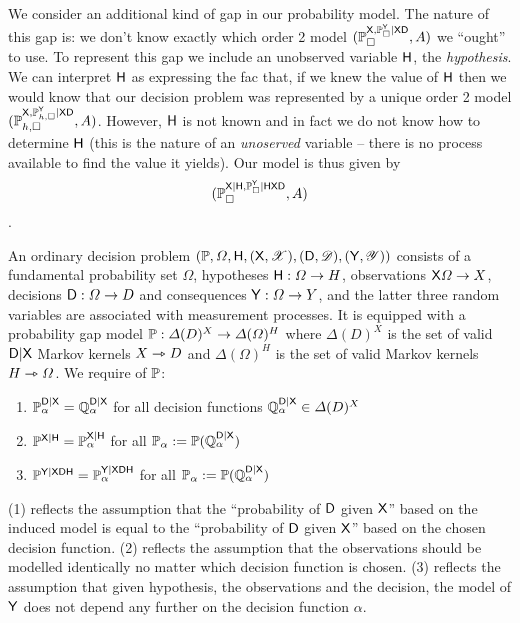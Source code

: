 We consider an additional kind of gap in our probability model. The nature of this gap is: we don't know exactly which order 2 model $(\mathbb{P}_\square^{\mathsf{X},\mathbb{P}_\square^{\mathsf{Y}}|\mathsf{XD}},A)$ we ``ought'' to use. To represent this gap we include an unobserved variable $\mathsf{H}$, the \emph{hypothesis}. We can interpret $\mathsf{H}$ as expressing the fac that, if we knew the value of $\mathsf{H}$ then we would know that our decision problem was represented by a unique order 2 model $(\mathbb{P}_{h,\square}^{\mathsf{X},\mathbb{P}_{h,\square}^{\mathsf{Y}}|\mathsf{XD}},A)$. However, $\mathsf{H}$ is not known and in fact we do not know how to determine $\mathsf{H}$ (this is the nature of an \emph{unoserved} variable -- there is no process available to find the value it yields). Our model is thus given by $$(\mathbb{P}_\square^{\mathsf{X}|\mathsf{H},\mathbb{P}_\square^{\mathsf{Y}}|\mathsf{HXD}},A)$$.

\begin{definition}
An ordinary decision problem $(\mathbb{P},\Omega,\mathsf{H},(\mathsf{X},\mathscr{X}),(\mathsf{D},\mathscr{D}),(\mathsf{Y},\mathscr{Y}))$ consists of a fundamental probability set $\Omega$, hypotheses $\mathsf{H}:\Omega\to H$, observations $\mathsf{X}\Omega\to X$, decisions $\mathsf{D}:\Omega\to D$ and consequences $\mathsf{Y}:\Omega\to Y$, and the latter three random variables are associated with measurement processes. It is equipped with a probability gap model $\mathbb{P}:\Delta(D)^X\to \Delta(\Omega)^H$ where $\Delta(D)^X$ is the set of valid $\mathsf{D}|\mathsf{X}$ Markov kernels $X\rightarrowtriangle D$ and $\Delta(\Omega)^H$ is the set of valid Markov kernels $H\rightarrowtriangle \Omega$. We require of $\mathbb{P}$:
\begin{enumerate}
    \item $\mathbb{P}_\alpha^{\mathsf{D}|\mathsf{X}}=\mathbb{Q}_\alpha^{\mathsf{D}|\mathsf{X}}$ for all decision functions $\mathbb{Q}_\alpha^{\mathsf{D}|\mathsf{X}}\in \Delta(D)^X$
    \item $\mathbb{P}^{\mathsf{X}|\mathsf{H}}=\mathbb{P}_\alpha^{\mathsf{X}|\mathsf{H}}$ for all $\mathbb{P}_\alpha:=\mathbb{P}(\mathbb{Q}_\alpha^{\mathsf{D}|\mathsf{X}})$
    \item $\mathbb{P}^{\mathsf{Y}|\mathsf{XDH}}=\mathbb{P}_\alpha^{\mathsf{Y}|\mathsf{XDH}}$ for all $\mathbb{P}_\alpha:=\mathbb{P}(\mathbb{Q}_\alpha^{\mathsf{D}|\mathsf{X}})$
\end{enumerate}
\end{definition}

(1) reflects the assumption that the ``probability of $\mathsf{D}$ given $\mathsf{X}$'' based on the induced model is equal to the ``probability of $\mathsf{D}$ given $\mathsf{X}$'' based on the chosen decision function. (2) reflects the assumption that the observations should be modelled identically no matter which decision function is chosen. (3) reflects the assumption that given hypothesis, the observations and the decision, the model of $\mathsf{Y}$ does not depend any further on the decision function $\alpha$.

